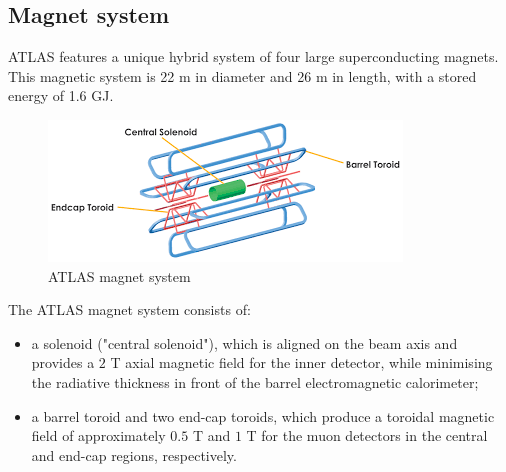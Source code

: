 \documentclass[a4paper, oneside, 11pt, openright]{book}
\begin{document}
				\subsection{Magnet system}
					ATLAS features a unique hybrid system of four large superconducting magnets.  This magnetic system is 22 m in diameter and 26 m in length, with a stored energy of 1.6 GJ. \\
					\begin{figure}[H]
						\centering
						\includegraphics[width=0.5\textheight]{tesi_images/magnet_system_atlas.png}
						\caption{ATLAS magnet system}
					\end{figure}
					The  ATLAS  magnet  system consists of:
					\begin{itemize}
						\item a solenoid ("central solenoid"), which is aligned on the beam axis and provides a $2$ T axial magnetic field for the inner detector,  while minimising the radiative thickness in front of the barrel electromagnetic calorimeter;
						\item a  barrel  toroid and  two  end-cap  toroids, which  produce  a toroidal magnetic field of approximately $0.5$ T and $1$ T for the muon detectors in the central and end-cap regions, respectively.
					\end{itemize}
\end{document}
